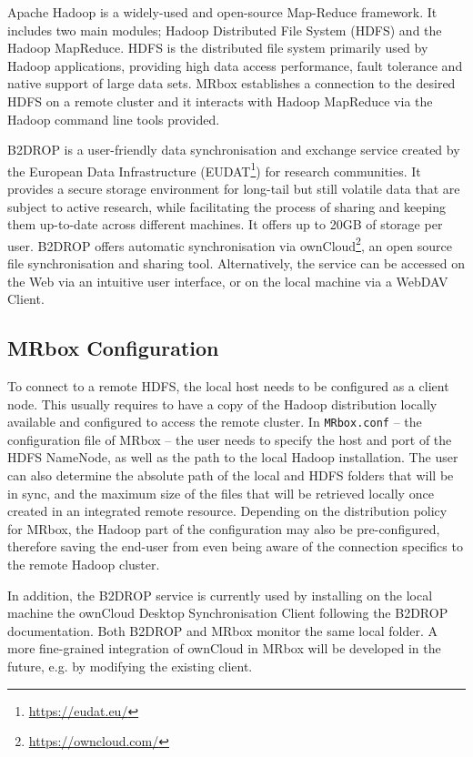 Apache Hadoop is a widely-used and open-source Map-Reduce framework. It includes two main modules; Hadoop Distributed File System (HDFS) and the Hadoop MapReduce. HDFS is the distributed file system primarily used by Hadoop applications, providing high data access performance, fault tolerance and native support of large data sets. MRbox establishes a connection to the desired HDFS on a remote cluster and it interacts with Hadoop MapReduce via the Hadoop command line tools provided.

B2DROP\cite{b2drop} is a user-friendly data synchronisation and exchange service created by the European Data Infrastructure (EUDAT\footnote{\url{https://eudat.eu/}}) for research communities. It provides a secure storage environment for long-tail but still volatile data that are subject to active research, while facilitating the process of sharing and keeping them up-to-date across different machines. It offers up to 20GB of storage per user. B2DROP offers automatic synchronisation via ownCloud\footnote{\url{https://owncloud.com/}}, an open source file synchronisation and sharing tool. Alternatively, the service can be accessed on the Web via an intuitive user interface, or on the local machine via a WebDAV Client.

\subsection{MRbox Configuration}
To connect to a remote HDFS, the local host needs to be configured as a client node. This usually requires to have a copy of the Hadoop distribution locally available and configured to access the remote cluster\cite{hadoopinst}. In \texttt{MRbox.conf} -- the configuration file of MRbox -- the user needs to specify the host and port of the HDFS NameNode, as well as the path to the local Hadoop installation. The user can also determine the absolute path of the local and HDFS folders that will be in sync, and the maximum size of the files that will be retrieved locally once created in an integrated remote resource. Depending on the distribution policy for MRbox, the Hadoop part of the configuration may also be pre-configured, therefore saving the end-user from even being aware of the connection specifics to the remote Hadoop cluster.

In addition, the B2DROP service is currently used by installing on the local machine the ownCloud Desktop Synchronisation Client following the B2DROP documentation. Both B2DROP and MRbox monitor the same local folder. A more fine-grained integration of ownCloud in MRbox will be developed in the future, e.g. by modifying the existing client.

